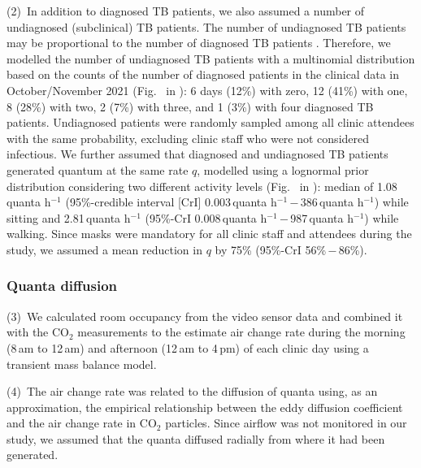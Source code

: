 \documentclass[fleqn,11pt]{wlscirep}
\begin{document}
(2)~In addition to diagnosed TB patients, we also assumed a number of undiagnosed (subclinical) TB patients. The number of undiagnosed TB patients may be proportional to the number of diagnosed TB patients \cite{Berhanu2023CID,Moyo2022LancetID,Patterson2024PNAS}. Therefore, we modelled the number of undiagnosed TB patients with a multinomial distribution based on the counts of the number of diagnosed patients in the clinical data in October/November 2021 (Fig.~ in \supp): 6 days (12\%) with zero, 12 (41\%) with one, 8 (28\%) with two, 2 (7\%) with three, and 1 (3\%) with four diagnosed TB patients. Undiagnosed patients were randomly sampled among all clinic attendees with the same probability, excluding clinic staff who were not considered infectious. We further assumed that diagnosed and undiagnosed TB patients generated quantum at the same rate $q$, modelled using a lognormal prior distribution considering two different activity levels (Fig.~ in \supp): median of 1.08\,quanta h$^{-1}$ (95\%-credible interval [CrI] 0.003\,quanta h$^{-1}$\,$-$\,386\,quanta h$^{-1}$) while sitting and 2.81\,quanta h$^{-1}$ (95\%-CrI 0.008\,quanta h$^{-1}$\,$-$\,987\,quanta h$^{-1}$) while walking\cite{Mikszewski2021GF,Buonanno2020EI,Banholzer2024PGPH}. Since masks were mandatory for all clinic staff and attendees during the study, we assumed a mean reduction in $q$ by 75\% (95\%-CrI 56\%\,$-$\,86\%)\cite{Dharmadhikari2012AJRCCM,McCreesh2021BMJGlobalHealth}.

\subsubsection*{Quanta diffusion}

(3)~We calculated  room occupancy from the video sensor data and combined it with the CO$_2$ measurements  to the estimate air change rate during the morning (8\,am to 12\,am) and afternoon (12\,am to 4\,pm) of each clinic day using a transient mass balance model\cite{Batterman2017IJERPH}. 

(4)~The air change rate was related to the diffusion of quanta using, as an approximation, the empirical relationship between the eddy diffusion coefficient and the air change rate in CO$_2$ particles\cite{Cheng2011EnvSciTech,Foat2020BE}. Since airflow was not monitored in our study, we assumed that the quanta diffused radially from where it had been generated. 
\end{document}
